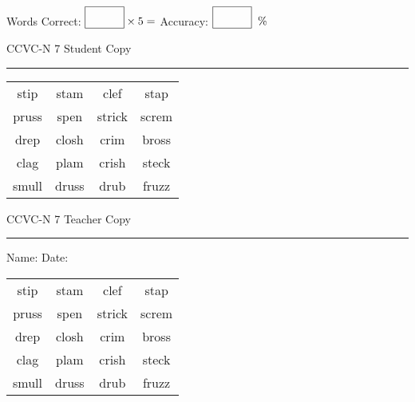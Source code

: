 \documentclass{memoir}
\begin{document}
\small

Words Correct: $\fbox{\phantom{\huge 100}} \times 5 = $ Accuracy: $\fbox{\phantom{\huge 100}}\;\; \%$ 

\vfill

\newpage


\footnotesize \noindent
CCVC-N 7 \hfill Student Copy
\smallskip
\hrule

\Large

\setlength{\tabcolsep}{14pt}
\def\arraystretch{3}

{\selectfont


\begin{vplace}[0.5]
\begin{center}
\begin{tabular}{cccc}
stip & stam            & clef             & stap \\
pruss       & spen & strick & screm \\
drep & closh            & crim & bross       \\
clag & plam & crish & steck \\
smull & druss & drub             & fruzz \\
\end{tabular}
\end{center}
\end{vplace}

}

\newpage

\footnotesize \noindent
CCVC-N 7 \hfill Teacher Copy
\smallskip
\hrule

\small

\vfill

\noindent
Name: \underline{\hspace{1.75in}} \hfill Date: \underline{\hspace{1in}}

\Large

{\selectfont


\begin{vplace}[0.5]
\begin{center}
\begin{tabular}{cccc}
stip & stam            & clef             & stap \\
pruss       & spen & strick & screm \\
drep & closh            & crim & bross       \\
clag & plam & crish & steck \\
smull & druss & drub             & fruzz \\
\end{tabular}
\end{center}
\end{vplace}



}
\end{document}
